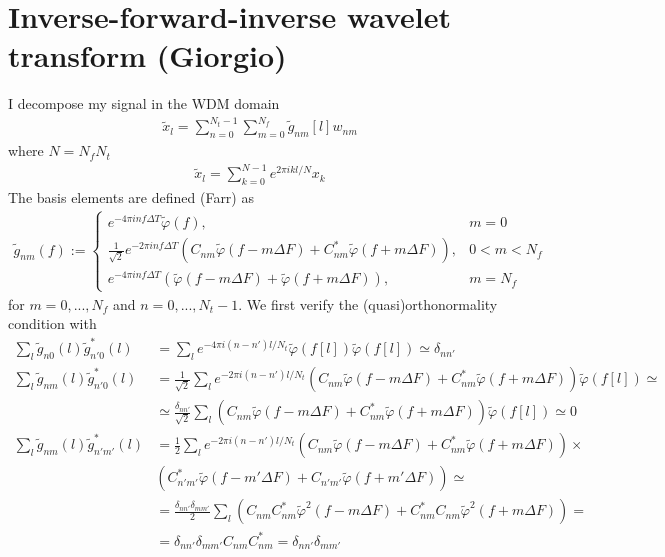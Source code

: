 \documentclass[%
 reprint,
superscriptaddress,
nofootinbib,
 amsmath,amssymb,
 aps,
colorlinks = true, 
linkcolor = blue, 
urlcolor = blue, 
citecolor = blue, 
anchorcolor = blue,
]{revtex4-2}
\begin{document}
\section{Inverse-forward-inverse wavelet transform (Giorgio)}
I decompose my signal in the WDM domain
%
\begin{align}
\tilde x_l=\sum_{n=0}^{N_t-1}\sum_{m=0}^{N_f}\tilde g_{nm}[l] w_{nm}
\end{align}
%
where $N=N_fN_t$
%
\begin{align}
\tilde x_l=\sum_{k=0}^{N-1} e^{2\pi i k l/N}x_k
\end{align}
%
The basis elements are defined (Farr) as
%
\begin{align}
\tilde{g}_{n m}(f):= \begin{cases}
e^{-4\pi i n f \Delta T} \tilde{\varphi}(f), & m=0 \\
\frac{1}{\sqrt{2}}e^{-2 \pi i n f \Delta T}\left(C_{n m} \tilde{\varphi}(f-m \Delta F)+C_{n m}^* \tilde{\varphi}(f+m \Delta F)\right), & 0<m<N_f \\
e^{-4 \pi i n f \Delta T}\left(\tilde{\varphi}(f-m \Delta F)+\tilde{\varphi}(f+m \Delta F)\right), & m=N_f
\end{cases}
\end{align}
%
for $m=0,...,N_f$ and $n=0,...,N_t-1$. We first verify the (quasi)orthonormality condition with
%
\begin{align}
\sum_l \tilde{g}_{n 0}(l)\tilde{g}^*_{n' 0}(l)&=\sum_l e^{-4\pi i (n-n') l/N_t} \tilde{\varphi}(f[l])\tilde{\varphi}(f[l])\simeq\delta_{nn'}\nonumber\\
\sum_l \tilde{g}_{n m}(l)\tilde{g}^*_{n' 0}(l)&=\frac{1}{\sqrt{2}}\sum_l e^{-2\pi i (n-n') l/N_t} \left(C_{n m} \tilde{\varphi}(f-m \Delta F)+C_{n m}^* \tilde{\varphi}(f+m \Delta F)\right)\tilde{\varphi}(f[l])\simeq\nonumber\\
&\simeq\frac{\delta_{nn'}}{\sqrt{2}}\sum_l  \left(C_{n m} \tilde{\varphi}(f-m \Delta F)+C_{n m}^* \tilde{\varphi}(f+m \Delta F)\right)\tilde{\varphi}(f[l])\simeq 0\nonumber\\
\sum_l \tilde{g}_{n m}(l)\tilde{g}^*_{n' m'}(l)&=\frac{1}{2}\sum_l e^{-2\pi i (n-n') l/N_t} \left(C_{n m} \tilde{\varphi}(f-m \Delta F)+C_{n m}^* \tilde{\varphi}(f+m \Delta F)\right)\times \nonumber\\
&\left(C_{n' m'}^* \tilde{\varphi}(f-m' \Delta F)+C_{n' m'} \tilde{\varphi}(f+m' \Delta F)\right)\simeq\nonumber\\
&=\frac{\delta_{nn'}\delta_{mm'}}{2}\sum_l \left(C_{n m}C_{n m}^* \tilde{\varphi}^2(f-m \Delta F)+C_{n m}^*C_{n m} \tilde{\varphi}^2(f+m \Delta F)\right)=\nonumber\\
&=\delta_{nn'}\delta_{mm'}C_{n m}C_{n m}^*=\delta_{nn'}\delta_{mm'}
\end{align}
\end{document}
